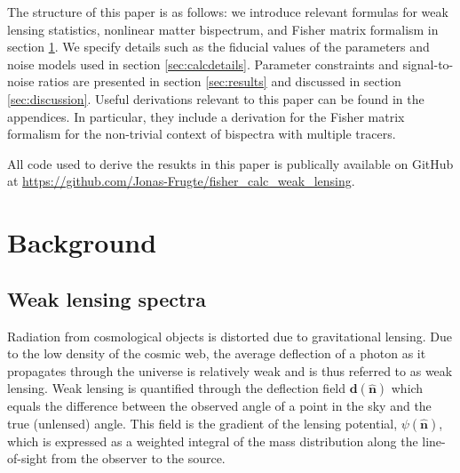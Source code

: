 \documentclass[11pt]{article} %
\begin{document}
 

The structure of this paper is as follows: we introduce relevant formulas for weak lensing statistics, nonlinear matter bispectrum, and Fisher matrix formalism in section \ref{sec:theory}. We specify details such as the fiducial values of the parameters and noise models used in section \ref{sec:calcdetails}. Parameter constraints and signal-to-noise ratios are presented in section \ref{sec:results} and discussed in section \ref{sec:discussion}. Useful derivations relevant to this paper can be found in the appendices. In particular, they include a derivation for the Fisher matrix formalism for the non-trivial context of bispectra with multiple tracers.

All code used to derive the resukts in this paper is publically available on GitHub at \url{https://github.com/Jonas-Frugte/fisher_calc_weak_lensing}.



%     

\section{Background}
\label{sec:theory}
\subsection{Weak lensing spectra}
Radiation from cosmological objects is distorted due to gravitational lensing. Due to the low density of the cosmic web, the average deflection of a photon as it propagates through the universe is relatively weak and is thus referred to as weak lensing. Weak lensing is quantified through the deflection field $\mathbf d(\hat {\mathbf n})$ which equals the difference between the observed angle of a point in the sky and the true (unlensed) angle. This field is the gradient of the lensing potential, $\psi(\hat {\mathbf n})$, which is expressed as a weighted integral of the mass distribution along the line-of-sight from the observer to the source.
\end{document}

